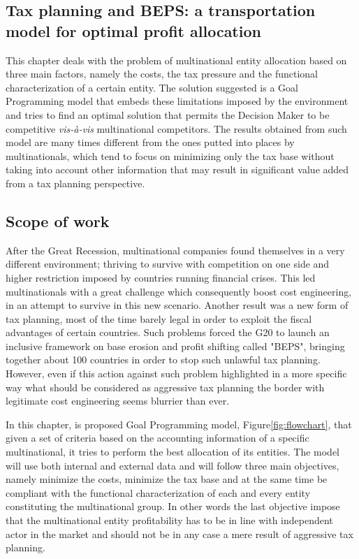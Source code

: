 \begin{doublespace}
\chapter{Tax planning and BEPS: a transportation model for optimal profit allocation}
This chapter deals with the problem of multinational entity allocation based on three main factors, namely the costs, the tax pressure and the functional characterization of a certain entity. The solution suggested is a Goal Programming model that embeds these limitations imposed by the environment and tries to find an optimal solution that permits the Decision Maker to be competitive \textit{vis-à-vis} multinational competitors. The results obtained from such model are many times different from the ones putted into places by multinationals, which tend to focus on minimizing only the tax base without taking into account other information that may result in significant value added from a tax planning perspective. 

\section{Scope of work}
After the Great Recession, multinational companies found themselves in a very different environment; thriving to survive with competition on one side and higher restriction imposed by countries running financial crises. This led multinationals with a great challenge which consequently boost cost engineering, in an attempt to survive in this new scenario. Another result was a new form of tax planning, most of the time barely legal in order to exploit the fiscal advantages of certain countries\cite{After_tax_hedging_report_2013}. Such problems forced the G20 to launch an inclusive framework on base erosion and profit shifting called "BEPS", bringing together about 100 countries in order to stop such unlawful tax planning. However, even if this action against such problem highlighted in a more specific way what should be considered as aggressive tax planning the border with legitimate cost engineering seems blurrier than ever\cite{Feller2017}.

In this chapter, is proposed Goal Programming model, Figure\ref{fig:flowchart}, that given a set of criteria based on the accounting information of a specific multinational, it tries to perform the best allocation of its entities. The model will use both internal and external data and will follow three main objectives, namely minimize the costs, minimize the tax base and at the same time be compliant with the functional characterization of each and every entity constituting the multinational group. In other words the last objective impose that the multinational entity profitability has to be in line with independent actor in the market\cite{Model_Tax_Convention_2015} and should not be in any case a mere result of aggressive tax planning.


\end{doublespace}
